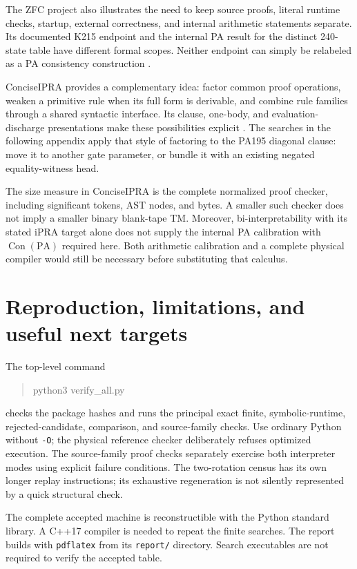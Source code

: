 \documentclass[11pt,letterpaper]{article}
\newcommand{\PA}{\mathrm{PA}}
\newcommand{\Con}{\operatorname{Con}}
\newcommand{\file}[1]{\texttt{\nolinkurl{#1}}}
\begin{document}
The ZFC project also illustrates the need to keep source proofs,
literal runtime checks, startup, external correctness, and internal
arithmetic statements separate. Its documented K215 endpoint and
the internal PA result for the distinct 240-state table have different
formal scopes. Neither endpoint can simply be relabeled as a PA
consistency construction \cite{zfc}.

ConciseIPRA provides a complementary idea: factor common proof
operations, weaken a primitive rule when its full form is derivable,
and combine rule families through a shared syntactic interface.
Its clause, one-body, and evaluation-discharge presentations make
these possibilities explicit \cite{ipra}. The searches in the following
appendix apply that style of factoring to the PA195 diagonal clause:
move it to another gate parameter, or bundle it with an existing
negated equality-witness head.

The size measure in ConciseIPRA is the complete normalized proof checker,
including significant tokens, AST nodes, and bytes. A smaller such
checker does not imply a smaller binary blank-tape TM. Moreover,
bi-interpretability with its stated iPRA target alone does not supply
the internal PA calibration with $\Con(\PA)$ required here.
Both arithmetic calibration and a complete physical compiler would
still be necessary before substituting that calculus.

\section{Reproduction, limitations, and useful next targets}
\label{sec:reproduce}
The top-level command
\begin{quote}\small\ttfamily
python3 verify\_all.py
\end{quote}
checks the package hashes and runs the principal exact finite,
symbolic-runtime, rejected-candidate, comparison, and source-family
checks. Use ordinary Python without \texttt{-O}; the physical
reference checker deliberately refuses optimized execution.
The source-family proof checks separately exercise both interpreter
modes using explicit failure conditions.
The two-rotation census has its own longer replay instructions;
its exhaustive regeneration is not silently represented by a
quick structural check.

The complete accepted machine is reconstructible with the Python
standard library. A C++17 compiler is needed to repeat the finite
searches. The report builds with \texttt{pdflatex} from its
\file{report/} directory. Search executables are not required to
verify the accepted table.
\end{document}
